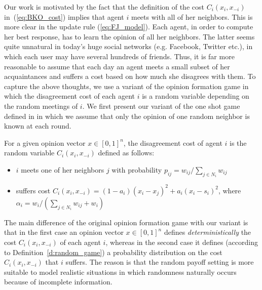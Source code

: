 Our work is motivated by the fact that the definition of the cost $C_i(x_i,x_{-i})$
in~(\ref{eq:BKO_cost}) implies that agent $i$ meets with all of
her neighbors.  This is more clear in the update rule (\ref{eq:FJ_model}).
Each agent, in order to compute her best response, has to learn the opinion of
all her neighbors.
The latter seems quite unnatural in today's huge social networks
(e.g. Facebook, Twitter etc.), in which each user may have
several hundreds of friends. Thus, it is far more reasonable to assume
that each day an agent meets a small subset of her acquaintances and
suffers a cost based on how much she disagrees with them. To capture the above thoughts,
we use a variant of the opinion formation game in which the
disagreement cost of each agent $i$ is a random variable depending
on the random meetings of $i$.
We first present our variant of the one shot game defined in \cite{BKO11} in which
we assume that only the opinion of one random neighbor is known at each round.
%
\begin{definition}\label{d:random_game}
  For a given opinion vector $x \in [0,1]^n$, the disagreement cost of agent $i$
  is the random variable $C_i(x_i,x_{-i})$ defined as follows:
  \begin{itemize}
    \item $i$ meets one of her neighbors $j$ with probability
      $p_{ij}= w_{ij}/\sum_{j\in N_i}w_{ij}$
    \item suffers cost $C_i(x_i , x_{-i}) = (1-a_i)(x_i-x_j)^2 + a_i(x_i-s_i)^2$,
      where $\alpha_i = w_i/(\sum_{j\in N_i}w_{ij}+w_i)$
  \end{itemize}
\end{definition}
%
The main difference of the original opinion formation game with our variant is that
in the first case an opinion vector $x\in [0,1]^n$ defines \emph{deterministically}
the cost $C_i(x_i,x_{-i})$ of each agent $i$, whereas in the second
case it defines (according to Definition~\ref{d:random_game})
a probability distribution on the cost $C_i(x_i,x_{-i})$ that $i$ suffers.
The reason is that the random payoff setting is more suitable to model realistic
situations in which randomness naturally occurs because of incomplete information.

